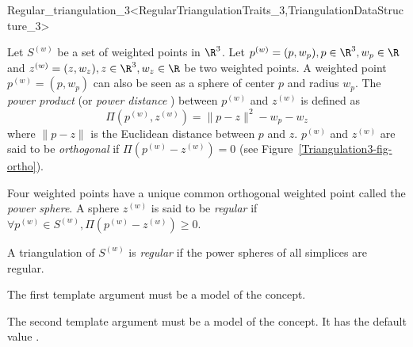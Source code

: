 

\begin{ccRefClass}{Regular_triangulation_3<RegularTriangulationTraits_3,TriangulationDataStructure_3>}

\ccDefinition
  Let ${S}^{(w)}$ be a set of weighted points in $\R^3$. Let
${p}^{(w)}=(p,w_p), p\in\R^3, w_p\in\R$ and 
${z}^{(w)}=(z,w_z), z\in\R^3, w_z\in\R$ be two weighted points. 
A weighted point
${p}^{(w)}=(p,w_p)$ can also be seen as a sphere of center $p$ and
radius $w_p$. 
The \textit{power product} (or  \textit{power distance} ) 
between ${p}^{(w)}$ and ${z}^{(w)}$ is
defined as 
\[\Pi({p}^{(w)},{z}^{(w)}) = {\|{p-z}\|^2-w_p-w_z}\]
where $\|{p-z}\|$ is the Euclidean distance between $p$ and $z$. 
 ${p}^{(w)}$ and ${z}^{(w)}$
are said to be \textit{orthogonal} if $\Pi{({p}^{(w)}-{z}^{(w)})}
= 0$ (see Figure~\ref{Triangulation3-fig-ortho}).

Four weighted points have a unique common orthogonal weighted point called
the \textit{power sphere}. A sphere ${z}^{(w)}$ is said to be
\textit{regular} if $\forall {p}^{(w)}\in{S}^{(w)},
\Pi{({p}^{(w)}-{z}^{(w)})}\geq 0$.

A triangulation of ${S}^{(w)}$ is \textit{regular} if the power spheres
of all simplices are regular. 


\ccParameters

The first template argument must be a model of the
 concept.

The second template argument must be a model of the
 concept.
It has the default value .



\ccTypes
{}


\end{ccRefClass}
